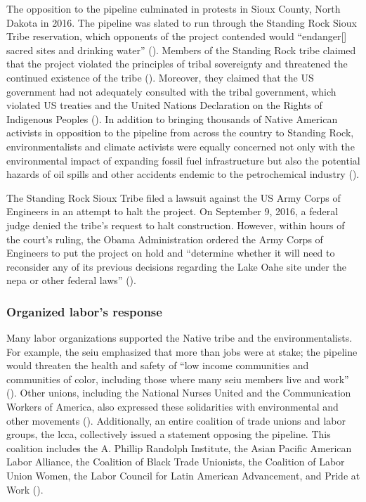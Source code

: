 \documentclass[12pt]{article}
\begin{document}
The opposition to the pipeline culminated in protests in Sioux County, North Dakota in 2016. The pipeline was slated to run through the Standing Rock Sioux Tribe reservation, which opponents of the project contended would “endanger[] sacred sites and drinking water” (\cite{sahaFiveThingsKnow2016}). Members of the Standing Rock tribe claimed that the project violated the principles of tribal sovereignty and threatened the continued existence of the tribe (\cite{massieUnderstandDakotaAccess2016}). Moreover, they claimed that the US government had not adequately consulted with the tribal government, which violated US treaties and the United Nations Declaration on the Rights of Indigenous Peoples (\cite{sahaFiveThingsKnow2016}). In addition to bringing thousands of Native American activists in opposition to the pipeline from across the country to Standing Rock, environmentalists and climate activists were equally concerned not only with the environmental impact of expanding fossil fuel infrastructure but also the potential hazards of oil spills and other accidents endemic to the petrochemical industry (\cite{sahaFiveThingsKnow2016}). 

The Standing Rock Sioux Tribe filed a lawsuit against the US Army Corps of Engineers in an attempt to halt the project. On September 9, 2016, a federal judge denied the tribe’s request to halt construction. However, within hours of the court’s ruling, the Obama Administration ordered the Army Corps of Engineers to put the project on hold and “determine whether it will need to reconsider any of its previous decisions regarding the Lake Oahe site under the \acrfull{nepa} or other federal laws” (\cite{officeofpublicaffairsJointStatementDepartment2016}). 

\subsubsection{Organized labor's response}

Many labor organizations supported the Native tribe and the environmentalists. For example, the \acrfull{seiu} emphasized that more than jobs were at stake; the pipeline would threaten the health and safety of “low income communities and communities of color, including those where many \acrshort{seiu} members live and work” (\cite{nlfUnionsWeighDakota2016}). Other unions, including the National Nurses United and the Communication Workers of America, also expressed these solidarities with environmental and other movements (\cite{nlfUnionsWeighDakota2016}). Additionally, an entire coalition of trade unions and labor groups, the \acrfull{lcca}, collectively issued a statement opposing the pipeline. This coalition includes the A. Phillip Randolph Institute, the Asian Pacific American Labor Alliance, the Coalition of Black Trade Unionists, the Coalition of Labor Union Women, the Labor Council for Latin American Advancement, and Pride at Work (\cite{apalaAFLCIOConstituencyGroups2016}).
\end{document}
